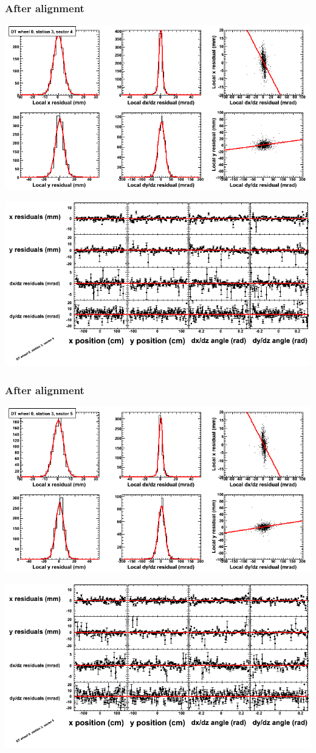 \documentclass[compress]{beamer}
\begin{document}
\begin{frame}
\frametitle{After alignment}
\includegraphics[width=0.7\linewidth]{NOV4_fitfunctions/MBwhCst3sec04_bellcurves.png}

\includegraphics[width=0.7\linewidth]{NOV4_fitfunctions/MBwhCst3sec04_polynomials.png}
\end{frame}

\begin{frame}
\frametitle{After alignment}
\includegraphics[width=0.7\linewidth]{NOV4_fitfunctions/MBwhCst3sec05_bellcurves.png}

\includegraphics[width=0.7\linewidth]{NOV4_fitfunctions/MBwhCst3sec05_polynomials.png}
\end{frame}
\end{document}
